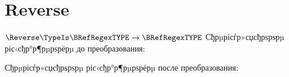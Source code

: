 \section{Reverse}
\begin{frame}{$\Reverse\TypeIs\BRefRegexTYPE\to\BRefRegexTYPE$}
	Сђрµрісѓр»сџсђрѕрѕрµ ріс‹сђр°р¶рµрѕрёрµ до преобразования:

	Сђрµрісѓр»сџсђрѕрѕрµ ріс‹сђр°р¶рµрѕрёрµ после преобразования:
\end{frame}